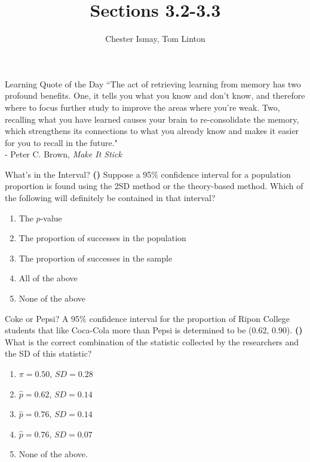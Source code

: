 \documentclass[13pt]{beamer}
\title{Sections 3.2-3.3 }
\author{Chester Ismay, Tom Linton}
\institute{Ripon College, Central College}
\date{}
\newcounter{count}
\newcommand{\quotes}[2]{\centering \Large{``#1"\\
\vspace*{0.2in}
\hspace*{0.5in} - #2}}
\newcommand{\question}{\textbf{(\decimal{count})} \stepcounter{count}}
\newenvironment{click}{\begin{enumerate}[A]}{\end{enumerate}}
\begin{document}
\begin{frame}
  \titlepage
\end{frame}


\begin{frame}{Learning Quote of the Day}
\quotes{The act of retrieving learning from memory has two profound benefits. One, it tells you what you know and don’t know, and therefore where to focus further study to improve the areas where you’re weak. Two, recalling what you have learned causes your brain to re-consolidate the memory, which strengthens its connections to what you already know and makes it easier for you to recall in the future.}{Peter C. Brown, \textit{Make It Stick}}
\end{frame}


\begin{frame}{What's in the Interval?}
\question Suppose a 95\% confidence interval for a population proportion is found using the 2SD method or the theory-based method.  Which of the following will definitely be contained in that interval?

\begin{click}
	\item The $p$-value
    \item The proportion of successes in the population
    \item The proportion of successes in the sample %
    \item All of the above
    \item None of the above
\end{click}

\end{frame}

\begin{frame}{Coke or Pepsi?}
A 95\% confidence interval for the proportion of Ripon College students that like Coca-Cola more than Pepsi is determined to be (0.62, 0.90).  \question What is the correct combination of the statistic collected by the researchers and the SD of this statistic?

\begin{click}
	\item $\pi = 0.50$, $SD = 0.28$
    \item $\hat{p} = 0.62$, $SD = 0.14$
    \item $\hat{p} = 0.76$, $SD = 0.14$
    \item $\hat{p} = 0.76$, $SD = 0.07$ %
    \item None of the above.
\end{click}

\end{frame}
\end{document}
